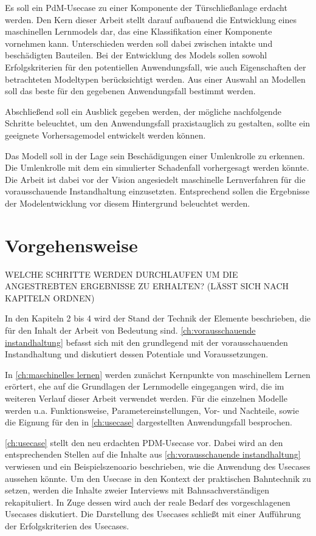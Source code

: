 Es soll ein PdM-Usecase zu einer Komponente der Türschließanlage erdacht werden. Den Kern dieser Arbeit stellt darauf aufbauend die Entwicklung eines maschinellen Lernmodels dar, das eine Klassifikation einer Komponente vornehmen kann. Unterschieden werden soll dabei zwischen intakte und beschädigten Bauteilen. Bei der Entwicklung des Models sollen sowohl Erfolgskriterien für den potentiellen Anwendungsfall, wie auch Eigenschaften der betrachteten Modeltypen berücksichtigt werden. Aus einer Auswahl an Modellen soll das beste für den gegebenen Anwendungsfall bestimmt werden.

Abschließend soll ein Ausblick gegeben werden, der mögliche nachfolgende Schritte beleuchtet, um den Anwendungsfall praxistauglich zu gestalten, sollte ein geeignete Vorhersagemodel entwickelt werden können.



Das Modell soll in der Lage sein Beschädigungen einer Umlenkrolle zu erkennen. Die Umlenkrolle mit dem ein simulierter Schadenfall vorhergesagt werden könnte. Die Arbeit ist dabei vor der Vision angesiedelt maschinelle Lernverfahren für die vorausschauende Instandhaltung einzusetzten. Entsprechend sollen die Ergebnisse der Modelentwicklung vor diesem Hintergrund beleuchtet werden.

\section{Vorgehensweise}
\label{sec:vorgehensweise}
WELCHE SCHRITTE WERDEN DURCHLAUFEN UM DIE ANGESTREBTEN ERGEBNISSE ZU ERHALTEN?
(LÄSST SICH NACH KAPITELN ORDNEN)

In den Kapiteln 2 bis 4 wird der Stand der Technik der Elemente beschrieben, die für den Inhalt der Arbeit von Bedeutung sind. \cref{ch:vorausschauende instandhaltung} befasst sich mit den grundlegend mit der vorausschauenden Instandhaltung und diskutiert dessen Potentiale und Voraussetzungen.

In \cref{ch:maschinelles lernen} werden zunächst Kernpunkte von maschinellem Lernen erörtert, ehe auf die Grundlagen der Lernmodelle eingegangen wird, die im weiteren Verlauf dieser Arbeit verwendet werden. Für die einzelnen Modelle werden u.a. Funktionsweise, Parametereinstellungen, Vor- und Nachteile, sowie die Eignung für den in \cref{ch:usecase} dargestellten Anwendungsfall besprochen.

\cref{ch:usecase} stellt den neu erdachten PDM-Usecase vor. Dabei wird an den entsprechenden Stellen auf die Inhalte aus \cref{ch:vorausschauende instandhaltung} verwiesen und ein Beispielszenoario beschrieben, wie die Anwendung des Usecases aussehen könnte. Um den Usecase in den Kontext der praktischen Bahntechnik zu setzen, werden die Inhalte zweier Interviews mit Bahnsachverständigen rekapituliert. In Zuge dessen wird auch der reale Bedarf des vorgeschlagenen Usecases diskutiert. Die Darstellung des Usecases schließt mit einer Aufführung der Erfolgskriterien des Usecases.

